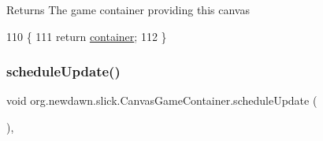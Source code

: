 \begin{DoxyReturn}{Returns}
The game container providing this canvas 
\end{DoxyReturn}

\begin{DoxyCode}
110                                         \{
111         \textcolor{keywordflow}{return} \mbox{\hyperlink{classorg_1_1newdawn_1_1slick_1_1_canvas_game_container_af13c765d7302dc5948d0261e2526ef8b}{container}};
112     \}
\end{DoxyCode}
\mbox{\label{classorg_1_1newdawn_1_1slick_1_1_canvas_game_container_a38f91f490299ca036d075779ff15ff15}} 
\subsubsection{\texorpdfstring{schedule\+Update()}{scheduleUpdate()}}
{\footnotesize\ttfamily void org.\+newdawn.\+slick.\+Canvas\+Game\+Container.\+schedule\+Update (\begin{DoxyParamCaption}{ }\end{DoxyParamCaption})\hspace{0.3cm}{\ttfamily [inline]}, {\ttfamily [private]}}


